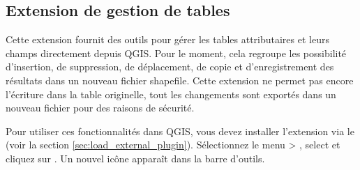 \subsection{Extension de gestion de tables}\label{sec:ftools}

Cette extension fournit des outils pour gérer les tables attributaires et leurs champs directement depuis QGIS. Pour le moment, cela regroupe les possibilité d'insertion, de suppression, de déplacement, de copie et d'enregistrement des résultats dans un nouveau fichier shapefile. Cette extension ne permet pas encore l'écriture dans la table originelle, tout les changements sont exportés dans un nouveau fichier pour des raisons de sécurité.


Pour utiliser ces fonctionnalités dans QGIS, vous devez installer l'extension via le  (voir la section 
\ref{sec:load_external_plugin}). Sélectionnez le menu  > , select  et cliquez sur . Un nouvel icône  apparaît dans la barre d'outils.
